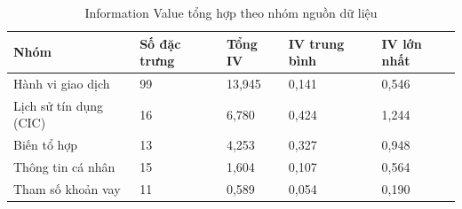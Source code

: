 \begin{table}[!htbp]
\centering
\caption{Information Value tổng hợp theo nhóm nguồn dữ liệu}
\label{tab:iv-group}
\small
\setlength{\tabcolsep}{5.0pt}
\begin{tabular}{@{}L{3.426cm}R{2.474cm}R{2.474cm}R{2.855cm}R{2.665cm}@{}}
\toprule
\textbf{Nhóm} & \textbf{Số đặc trưng} & \textbf{Tổng IV} & \textbf{IV trung bình} & \textbf{IV lớn nhất} \\
\midrule
Hành vi giao dịch & 99 & 13,945 & 0,141 & 0,546 \\
Lịch sử tín dụng (CIC) & 16 & 6,780 & 0,424 & 1,244 \\
Biến tổ hợp & 13 & 4,253 & 0,327 & 0,948 \\
Thông tin cá nhân & 15 & 1,604 & 0,107 & 0,564 \\
Tham số khoản vay & 11 & 0,589 & 0,054 & 0,190 \\
\bottomrule
\end{tabular}
\end{table}

